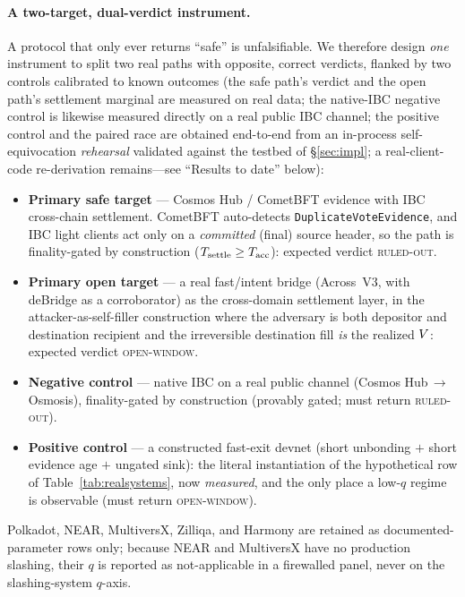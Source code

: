 \paragraph{A two-target, dual-verdict instrument.}
A protocol that only ever returns ``safe'' is unfalsifiable. We therefore design \emph{one}
instrument to split two real paths with opposite, correct verdicts, flanked by two controls
calibrated to known outcomes (the safe path's verdict and the open path's settlement marginal are
measured on real data; the native-IBC negative control is likewise measured directly on a real public
IBC channel; the positive control and the paired race are obtained end-to-end from an
in-process self-equivocation \emph{rehearsal} validated against the testbed of \S\ref{sec:impl}; a
real-client-code re-derivation remains---see ``Results to date'' below):
\begin{itemize}
  \item \textbf{Primary safe target} --- Cosmos Hub / CometBFT evidence with IBC cross-chain
  settlement. CometBFT auto-detects \texttt{DuplicateVoteEvidence}, and IBC light clients act only
  on a \emph{committed} (final) source header, so the path is finality-gated by construction
  ($T_{\mathrm{settle}}\ge T_{\mathrm{acc}}$): expected verdict \textsc{ruled-out}.
  \item \textbf{Primary open target} --- a real fast/intent bridge (Across~V3, with deBridge as a
  corroborator) as the cross-domain settlement layer, in the attacker-as-self-filler construction
  where the adversary is both depositor and destination recipient and the irreversible destination
  fill \emph{is} the realized $V$: expected verdict \textsc{open-window}.
  \item \textbf{Negative control} --- native IBC on a real public channel (Cosmos
  Hub\,$\to$\,Osmosis), finality-gated by construction (provably gated; must return
  \textsc{ruled-out}).
  \item \textbf{Positive control} --- a constructed fast-exit devnet (short unbonding $+$ short
  evidence age $+$ ungated sink): the literal instantiation of the hypothetical row of
  Table~\ref{tab:realsystems}, now \emph{measured}, and the only place a low-$q$ regime is
  observable (must return \textsc{open-window}).
\end{itemize}
Polkadot, NEAR, MultiversX, Zilliqa, and Harmony are retained as documented-parameter rows only;
because NEAR and MultiversX have no production slashing, their $q$ is reported as not-applicable in
a firewalled panel, never on the slashing-system $q$-axis.


